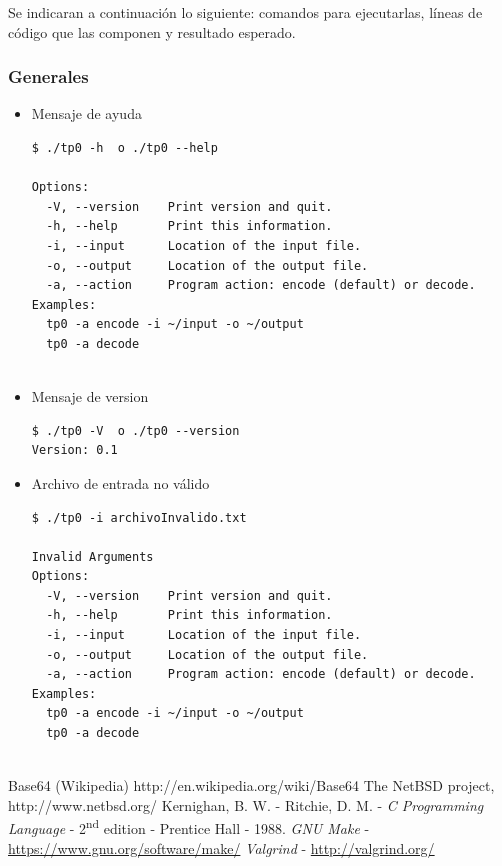 \documentclass[10pt,a4paper]{article}
\begin{document}
Se indicaran a continuación lo siguiente: comandos para ejecutarlas, líneas de código que las componen y resultado esperado.


\subsubsection{Generales}


\begin{itemize}
    \item Mensaje de ayuda\\
    
\begin{lstlisting}
$ ./tp0 -h  o ./tp0 --help

Options:
  -V, --version    Print version and quit.
  -h, --help       Print this information.
  -i, --input      Location of the input file.
  -o, --output     Location of the output file.
  -a, --action     Program action: encode (default) or decode.
Examples:
  tp0 -a encode -i ~/input -o ~/output
  tp0 -a decode


\end{lstlisting}     
     
	\item Mensaje de version\\

            \begin{lstlisting}
$ ./tp0 -V  o ./tp0 --version
Version: 0.1
             \end{lstlisting}  
         
         
    \item Archivo de entrada no válido
            \begin{lstlisting}
$ ./tp0 -i archivoInvalido.txt

Invalid Arguments
Options:
  -V, --version    Print version and quit.
  -h, --help       Print this information.
  -i, --input      Location of the input file.
  -o, --output     Location of the output file.
  -a, --action     Program action: encode (default) or decode.
Examples:
  tp0 -a encode -i ~/input -o ~/output
  tp0 -a decode


             \end{lstlisting}  

\end{itemize}


\newpage


\begin{thebibliography}{10}
	\bibitem{}Base64 (Wikipedia) http://en.wikipedia.org/wiki/Base64
	\bibitem{}The NetBSD project, http://www.netbsd.org/
	 Kernighan, B. W. - Ritchie, D. M. - \emph{C Programming Language} - 2\textsuperscript{nd} edition - Prentice Hall - 1988.
	 \emph{GNU Make} - \hyperlink{make}{https://www.gnu.org/software/make/}
	 \emph{Valgrind} - \hyperlink{valgrind}{http://valgrind.org/}

\end{thebibliography}
\newpage
\appendix
\end{document}
